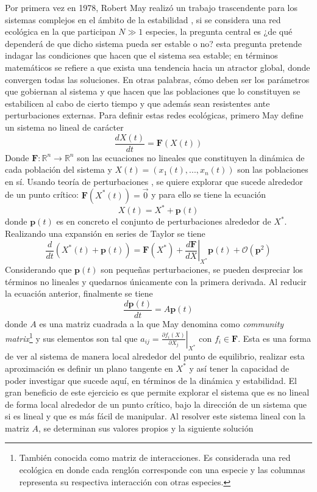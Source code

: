 Por primera vez en 1978, Robert May realizó un trabajo trascendente para los sistemas complejos en el ámbito de la estabilidad \cite{may1972will}, si se considera una red ecológica en la que participan $N\gg 1$ especies, la pregunta central es ¿de qué dependerá de que dicho sistema pueda ser estable o no? esta pregunta pretende indagar las condiciones que hacen que el sistema sea estable; en términos matemáticos se refiere a que exista una tendencia hacia un atractor global, donde convergen todas las soluciones. En otras palabras, cómo deben ser los parámetros que gobiernan al sistema y que hacen que las poblaciones que lo constituyen se estabilicen al cabo de cierto tiempo y que además sean resistentes ante perturbaciones externas. Para definir estas redes ecológicas, primero May define un sistema no lineal de carácter
$$\frac{dX(t)}{dt}=\textbf{F}(X(t))$$
Donde $\textbf{F}:\mathbb{R}^n\to\mathbb{R}^n$ son las ecuaciones no lineales que constituyen la dinámica de cada población del sistema y $X(t)=(x_1(t),...,x_n(t))$ son las poblaciones en sí. Usando teoría de perturbaciones \cite{may2019stability}, se quiere explorar que sucede alrededor de un punto crítico: $\textbf{F}(X^*(t))=\vec{0}$ y para ello se tiene la ecuación
$$X(t)=X ^*+\textbf{p}(t)$$
donde $\textbf{p}(t)$ es en concreto el conjunto de perturbaciones alrededor de $X^*$. Realizando una expansión en series de Taylor se tiene 
$$\frac{d}{dt}\left (X^*(t)+\textbf{p}(t)\right )=\textbf{F}(X^*)+\left .\frac{d\textbf{F}}{dX}\right  |_{X^*}\textbf{p}(t)+\mathcal{O}(\textbf{p}^2)$$
Considerando que $\textbf{p}(t)$ son pequeñas perturbaciones, se pueden despreciar los términos no lineales y quedarnos únicamente con la primera derivada. Al reducir la ecuación anterior, finalmente se tiene 
$$\frac{d\textbf{p}(t)}{dt}=A\textbf{p}(t)$$
donde $A$ es una matriz cuadrada a la que May denomina como \textit{community matrix}\footnote{También conocida como matriz de interacciones. Es considerada una red ecológica en donde cada renglón corresponde con una especie y las columnas representa su respectiva interacción con otras especies.} y sus elementos son tal que $a_{ij}=\left .\frac{\partial f_i(X)}{\partial X_j}\right |_{X^*}$ con $f_i\in\textbf{F}$. Esta es una forma de ver al sistema de manera local alrededor del punto de equilibrio, realizar esta aproximación es definir un plano tangente en $X^*$ y así tener la capacidad de poder investigar que sucede aquí, en términos de la dinámica y estabilidad. El gran beneficio de este ejercicio es que permite explorar el sistema que es no lineal de forma local alrededor de un punto crítico, bajo la dirección de un sistema que si es lineal y que es más fácil de manipular. Al resolver este sistema lineal con la matriz $A$, se determinan sus valores propios y la siguiente solución
